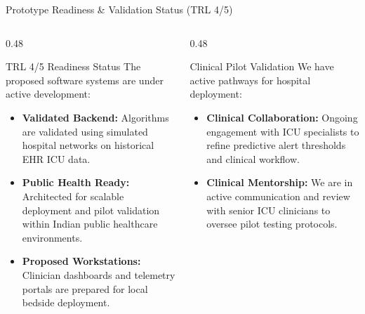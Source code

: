\documentclass[aspectratio=169, 11pt]{beamer}
\begin{document}
\begin{frame}{Prototype Readiness \& Validation Status (TRL 4/5)}
    \begin{columns}[t]
        \begin{column}{0.48\textwidth}
            \begin{block}{\textcolor{neonCyan}{TRL 4/5 Readiness Status}}
                \scriptsize
                The proposed software systems are under active development:
                \begin{itemize}
                    \item \textbf{Validated Backend:} Algorithms are validated using simulated hospital networks on historical EHR ICU data.
                    \item \textbf{Public Health Ready:} Architected for scalable deployment and pilot validation within Indian public healthcare environments.
                    \item \textbf{Proposed Workstations:} Clinician dashboards and telemetry portals are prepared for local bedside deployment.
                \end{itemize}
            \end{block}
        \end{column}
        
        \begin{column}{0.48\textwidth}
            \begin{block}{\textcolor{neonTeal}{Clinical Pilot Validation}}
                \scriptsize
                We have active pathways for hospital deployment:
                \begin{itemize}
                    \item \textbf{Clinical Collaboration:} Ongoing engagement with ICU specialists to refine predictive alert thresholds and clinical workflow.
                    \item \textbf{Clinical Mentorship:} We are in active communication and review with senior ICU clinicians to oversee pilot testing protocols.
                \end{itemize}
            \end{block}
        \end{column}
    \end{columns}
\end{frame}
\end{document}
